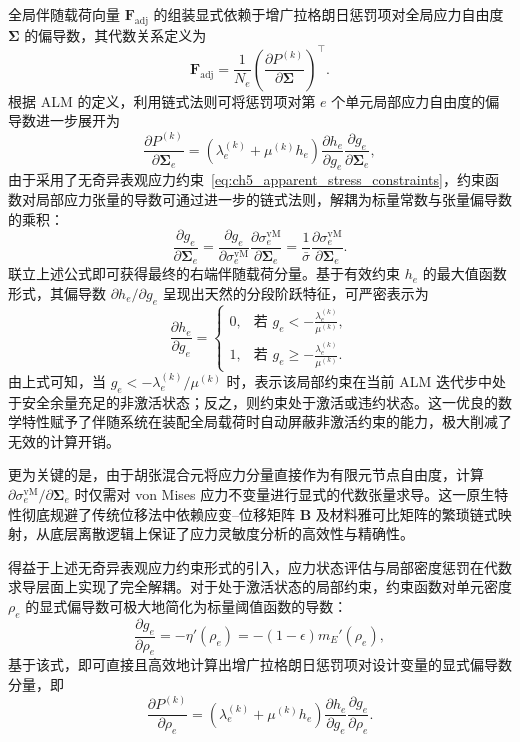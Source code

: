 全局伴随载荷向量 $\boldsymbol{F}_{\text{adj}}$ 的组装显式依赖于增广拉格朗日惩罚项对全局应力自由度 $\boldsymbol{\Sigma}$ 的偏导数，其代数关系定义为
\[
\boldsymbol{F}_{\text{adj}} = \frac{1}{N_e} \left( \frac{\partial P^{(k)}}{\partial \boldsymbol{\Sigma}} \right)^{\top}.
\]
根据 ALM 的定义，利用链式法则可将惩罚项对第 $e$ 个单元局部应力自由度的偏导数进一步展开为
\[
\frac{\partial P^{(k)}}{\partial \boldsymbol{\Sigma}_e} = \left( \lambda_e^{(k)} + \mu^{(k)} h_e \right) \frac{\partial h_e}{\partial g_e} \frac{\partial g_e}{\partial \boldsymbol{\Sigma}_e},
\]
由于采用了无奇异表观应力约束~\eqref{eq:ch5_apparent_stress_constraints}，约束函数对局部应力张量的导数可通过进一步的链式法则，解耦为标量常数与张量偏导数的乘积：
\[
\frac{\partial g_e}{\partial \boldsymbol{\Sigma}_e} = \frac{\partial g_e}{\partial \sigma_e^{\mathrm{vM}}} \frac{\partial \sigma_e^{\mathrm{vM}}}{\partial \boldsymbol{\Sigma}_e} = \frac{1}{\bar{\sigma}} \frac{\partial \sigma_e^{\mathrm{vM}}}{\partial \boldsymbol{\Sigma}_e}.
\]
联立上述公式即可获得最终的右端伴随载荷分量。基于有效约束 $h_e$ 的最大值函数形式，其偏导数 $\partial h_e / \partial g_e$ 呈现出天然的分段阶跃特征，可严密表示为
\[
\frac{\partial h_e}{\partial g_e} = 
\begin{cases} 
	0, & \text{若 } g_e < -\frac{\lambda_e^{(k)}}{\mu^{(k)}}, \\ 
	1, & \text{若 } g_e \ge -\frac{\lambda_e^{(k)}}{\mu^{(k)}}. 
\end{cases}
\]
由上式可知，当 $g_e < -\lambda_e^{(k)}/\mu^{(k)}$ 时，表示该局部约束在当前 ALM 迭代步中处于安全余量充足的非激活状态；反之，则约束处于激活或违约状态。这一优良的数学特性赋予了伴随系统在装配全局载荷时自动屏蔽非激活约束的能力，极大削减了无效的计算开销。

更为关键的是，由于胡张混合元将应力分量直接作为有限元节点自由度，计算 $\partial \sigma_e^{\mathrm{vM}} / \partial \boldsymbol{\Sigma}_e$ 时仅需对 von Mises 应力不变量进行显式的代数张量求导。这一原生特性彻底规避了传统位移法中依赖应变{--}位移矩阵 $\boldsymbol{B}$ 及材料雅可比矩阵的繁琐链式映射，从底层离散逻辑上保证了应力灵敏度分析的高效性与精确性。

得益于上述无奇异表观应力约束形式的引入，应力状态评估与局部密度惩罚在代数求导层面上实现了完全解耦。对于处于激活状态的局部约束，约束函数对单元密度 $\rho_e$ 的显式偏导数可极大地简化为标量阈值函数的导数：
\[
\frac{\partial g_e}{\partial \rho_e} = - \eta'(\rho_e) = - (1 - \epsilon) m_E'(\rho_e),
\]
基于该式，即可直接且高效地计算出增广拉格朗日惩罚项对设计变量的显式偏导数分量，即
\[
\frac{\partial P^{(k)}}{\partial \rho_e} = \left( \lambda_e^{(k)} + \mu^{(k)} h_e \right) \frac{\partial h_e}{\partial g_e} \frac{\partial g_e}{\partial \rho_e}.
\]


